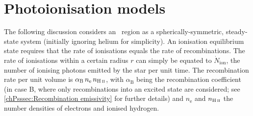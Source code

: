 \chapter{Photoionisation models}
\label{app:Photoionisation_model}

The following discussion considers an \HII\ region as a spherically-symmetric, steady-state system (initially ignoring helium for simplicity). An ionisation equilibrium state requires that the rate of ionisations equals the rate of recombinations. The rate of ionisations within a certain radius $r$ can simply be equated to $\dot{N}_\text{ion}$, the number of ionising photons emitted by the star per unit time. The recombination rate per unit volume is $\alpha_\text{B} \, n_\text{e} \, n_\text{\HII}$, with $\alpha_\text{B}$ being the recombination coefficient (in case B, where only recombinations into an excited state are considered; see \cref{chPsssec:Recombination emissivity} for further details) and $n_\text{e}$ and $n_\text{\HII}$ the number densities of electrons and ionised hydrogen.

